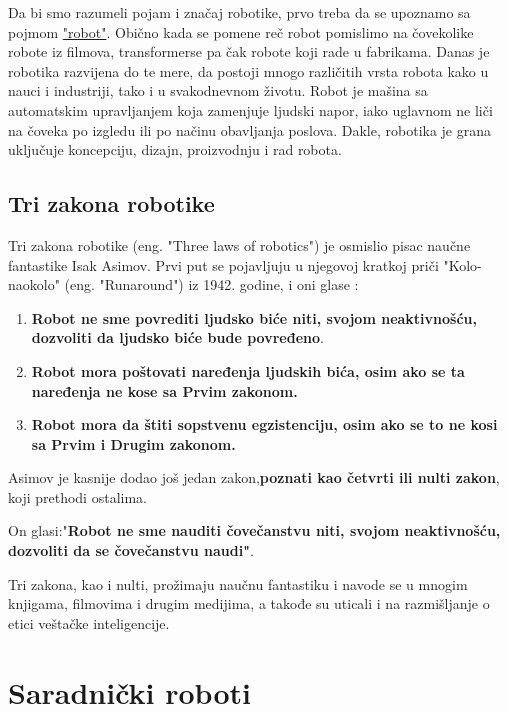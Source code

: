 \documentclass{article}
\begin{document}
	
	
	Da bi smo razumeli pojam i značaj robotike, prvo treba da se upoznamo sa pojmom \href{https://www.sciencefriday.com/segments/the-origin-of-the-word-robot/}{"robot"}.\cite{word robot}
	Obično kada se pomene reč robot pomislimo na čovekolike robote iz filmova, transformerse pa čak robote koji rade u fabrikama. Danas je robotika razvijena do te mere, da postoji mnogo različitih vrsta robota kako u nauci i industriji, tako i u svakodnevnom životu. Robot je mašina sa automatskim upravljanjem koja zamenjuje ljudski napor, iako uglavnom ne liči na čoveka po izgledu ili po načinu obavljanja poslova. Dakle, robotika je grana uključuje koncepciju, dizajn, proizvodnju i rad robota. \cite{robots in nowdays}
	
	\subsection{Tri zakona robotike}
	Tri zakona robotike (eng. "Three laws of robotics") je osmislio pisac naučne fantastike Isak Asimov. Prvi put se pojavljuju u njegovoj kratkoj priči "Kolo-naokolo" (eng. "Runaround") iz 1942. godine, i oni glase \cite{three laws of robotics}:
	\begin{enumerate}
	\item \textbf{Robot ne sme povrediti ljudsko biće niti, svojom neaktivnošću, dozvoliti da ljudsko biće bude povređeno}.
	
	\item \textbf{Robot mora poštovati naređenja ljudskih bića, osim ako se ta naređenja ne kose sa Prvim zakonom.}
	
	\item \textbf{Robot mora da štiti sopstvenu egzistenciju, osim ako se to ne kosi sa Prvim i Drugim zakonom.}
	\end{enumerate}
	
	Asimov je kasnije dodao još jedan zakon,\textbf{poznati kao četvrti ili nulti zakon}, koji prethodi ostalima.\par
	
	On glasi:"\textbf{Robot ne sme nauditi čovečanstvu niti, svojom neaktivnošću, dozvoliti da se čovečanstvu naudi"}.\par
	Tri zakona, kao i nulti, prožimaju naučnu fantastiku i navode se u mnogim knjigama, filmovima i drugim medijima, a takođe su uticali i na razmišljanje o etici veštačke inteligencije. \cite{three laws of robotics}
	
	
	
	
	\section{Saradnički roboti}
	
\end{document}
